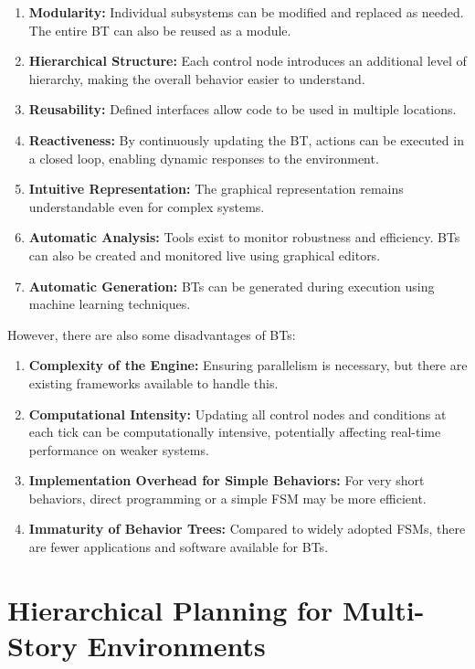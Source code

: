 \begin{enumerate}
  \item \textbf{Modularity:} Individual subsystems can be modified and replaced as needed. The entire BT can also be reused as a module.
  \item \textbf{Hierarchical Structure:} Each control node introduces an additional level of hierarchy, making the overall behavior easier to understand.
  \item \textbf{Reusability:} Defined interfaces allow code to be used in multiple locations.
  \item \textbf{Reactiveness:} By continuously updating the BT, actions can be executed in a closed loop, enabling dynamic responses to the environment.
  \item \textbf{Intuitive Representation:} The graphical representation remains understandable even for complex systems.
  \item \textbf{Automatic Analysis:} Tools exist to monitor robustness and efficiency. BTs can also be created and monitored live using graphical editors.
  \item \textbf{Automatic Generation:} BTs can be generated during execution using machine learning techniques.
\end{enumerate}

However, there are also some disadvantages of BTs:

\begin{enumerate}
  \item \textbf{Complexity of the Engine:} Ensuring parallelism is necessary, but there are existing frameworks available to handle this.
  \item \textbf{Computational Intensity:} Updating all control nodes and conditions at each tick can be computationally intensive, potentially affecting real-time performance on weaker systems.
  \item \textbf{Implementation Overhead for Simple Behaviors:} For very short behaviors, direct programming or a simple FSM may be more efficient.
  \item \textbf{Immaturity of Behavior Trees:} Compared to widely adopted FSMs, there are fewer applications and software available for BTs.
\end{enumerate}


\section{Hierarchical Planning for Multi-Story Environments}
\label{sec:hierarchical_planning}

